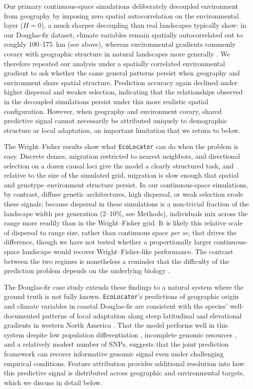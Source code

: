 \documentclass[]{article}
\newcommand{\dfir}{Douglas-fir\xspace}
\newcommand{\ecolocator}{\texttt{EcoLocator}\xspace}
\begin{document}
Our primary continuous-space simulations deliberately decoupled
environment from geography by imposing zero spatial autocorrelation on the
environmental layer ($H=0$), a much sharper decoupling than real landscapes
typically show: in our \dfir dataset, climate variables remain spatially
autocorrelated out to roughly 100--175~km (see above), whereas environmental
gradients commonly covary with geographic structure in natural landscapes
more generally \citep{meirmans_ibd_2012}.
We therefore repeated our analysis under a spatially correlated
environmental gradient to ask whether the same general patterns
persist when geography and environment share spatial structure.
Prediction accuracy again declined under higher dispersal
and weaker selection, indicating that the relationships observed
in the decoupled simulations persist under this more realistic
spatial configuration.
However, when geography and environment covary,
shared predictive signal cannot necessarily be attributed uniquely
to demographic structure or local adaptation,
an important limitation that we return to below.

The Wright--Fisher results show what \ecolocator can do
when the problem is easy. Discrete demes, migration restricted to
nearest neighbors, and directional selection on a dozen causal loci
give the model a clearly structured task, and relative to the size of
the simulated grid, migration is slow enough that spatial and
genotype--environment structure persist. In our continuous-space
simulations, by contrast, diffuse genetic architectures, high
dispersal, or weak selection erode these signals; because dispersal in these
simulations is a non-trivial fraction of the landscape width per
generation (2--10\%, see Methods), individuals mix across the range
more readily than in the Wright--Fisher grid. It is likely this relative scale of
dispersal to range size, rather than continuous space \textit{per se},
that drives the difference, though we have not tested whether a
proportionally larger continuous-space landscape would recover
Wright--Fisher-like performance. The contrast between the two regimes
is nonetheless a reminder that the difficulty of the prediction
problem depends on the underlying biology \citep{booker_wza_2024, dauphin_rethinking_2023}.

The \dfir case study extends these findings to a natural 
system where the ground truth is not fully known. 
\ecolocator's predictions of geographic origin and 
climate variables in coastal \dfir are consistent with the 
species' well-documented patterns of local adaptation along steep 
latitudinal and elevational gradients in western 
North America \citep{aitken_assisted_2013}. 
That the model performs well in this system
despite low population differentiation \citep{krutovsky_estimation_2009}, 
incomplete genomic resources \citep{neale_douglas-fir_2017}, 
and a relatively modest number of SNPs, 
suggests that the joint prediction framework can recover 
informative genomic signal even under challenging empirical conditions. 
Feature attribution provides additional resolution into how this 
predictive signal is distributed across geographic and environmental
targets, which we discuss in detail below.
\end{document}
